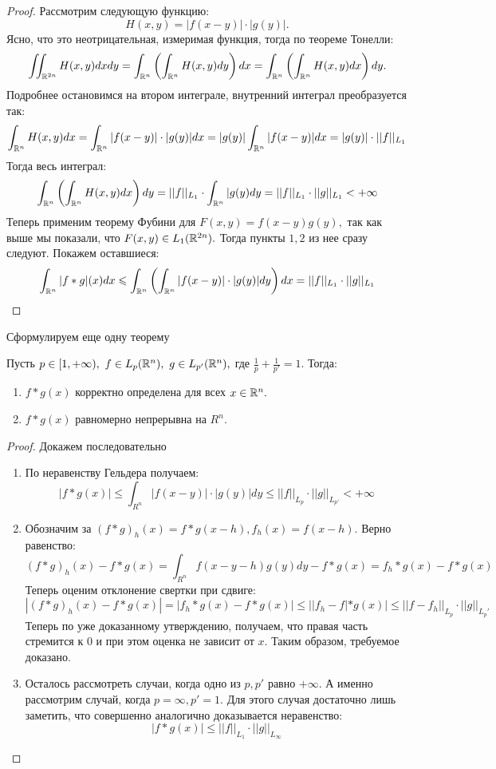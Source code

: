 \begin{proof}
    Рассмотрим следующую функцию:
    $$H(x, y) = |f(x - y)| \cdot |g(y)|.$$
    Ясно, что это неотрицательная, измеримая функция, тогда по теореме Тонелли:
    $$\iint_{\mathbb{R}^{2n}}H(x, y) dx dy = \int_{\mathbb{R}^n}\left( \int_{\mathbb{R}^n} H(x, y) dy\right) dx = \int_{\mathbb{R}^n}\left( \int_{\mathbb{R}^n} H(x, y) dx\right) dy.$$
    Подробнее остановимся на втором интеграле, внутренний интеграл преобразуется так:
    $$\int_{\mathbb{R}^n} H(x, y) dx = \int_{\mathbb{R}^n} |f(x - y)| \cdot |g(y)| dx = |g(y)| \int_{\mathbb{R}^n}|f(x - y)|dx = |g(y)| \cdot ||f||_{L_1}$$
    Тогда весь интеграл:
    $$ \int_{\mathbb{R}^n}\left( \int_{\mathbb{R}^n} H(x, y) dx\right) dy = ||f||_{L_1} \cdot  \int_{\mathbb{R}^n} |g(y) dy = ||f||_{L_1} \cdot ||g||_{L_1} < + \infty$$
    Теперь применим теорему Фубини для $F(x, y) = f(x - y) g(y),$ так как выше мы показали, что $F(x, y) \in L_1(\mathbb{R}^{2n}).$ Тогда пункты $1, 2$ из нее сразу следуют. Покажем оставшиеся:
    $$\int_{\mathbb{R}^n}|f*g|(x) dx \leqslant \int_{\mathbb{R}^n}\left( \int_{\mathbb{R}^n} |f(x - y)| \cdot |g(y)| dy \right) dx = ||f||_{L_1} \cdot ||g||_{L_1}$$
\end{proof}

Сформулируем еще одну теорему

\begin{theorem}
    Пусть $p \in [1, +\infty), \ f \in L_p(\mathbb{R}^n), \ g \in L_{p'}(\mathbb{R}^n), $ где $\frac{1}{p} + \frac{1}{p'} = 1.$ Тогда:
    \begin{enumerate}
        \item $f * g(x)$ корректно определена для всех $x \in \mathbb{R}^n.$
        \item $f * g(x)$ равномерно непрерывна на $R^n.$
    \end{enumerate}
\end{theorem}

\begin{proof}
Докажем последовательно
    \begin{enumerate}
        \item По неравенству Гельдера получаем:
        $$|f * g(x)| \leq \int_{R^n}|f(x - y)| \cdot |g(y)| dy \leq ||f||_{L_p} \cdot ||g||_{L_{p
        '}} < + \infty$$
        \item Обозначим за $(f * g)_h(x) = f * g(x - h), f_h(x) = f(x -h).$ Верно равенство:
        $$(f * g)_h(x) - f * g(x) = \int_{R^n} f(x - y -h) g(y)dy - f*g(x) = f_h * g(x) - f*g(x)$$
        Теперь оценим отклонение свертки при сдвиге:
        $$|(f * g)_h(x) - f * g(x)| = |f_h * g(x) - f*g(x)| \leq ||f_h - f| * g(x)| \leq ||f-f_h||_{L_p} \cdot ||g ||_{L_p'}$$
        Теперь по уже доказанному утверждению,  получаем, что правая часть стремится к $0$ и при этом оценка не зависит от $x.$ Таким образом, требуемое доказано.
        \item Осталось рассмотреть случаи, когда одно из $p, p'$ равно $+\infty.$ А именно рассмотрим случай, когда $p = \infty, p' = 1.$ Для этого случая достаточно лишь заметить, что совершенно аналогично доказывается неравенство:
        $$|f * g(x)| \leq ||f||_{L_1} \cdot ||g||_{L_{\infty}}$$
    \end{enumerate}
\end{proof}


